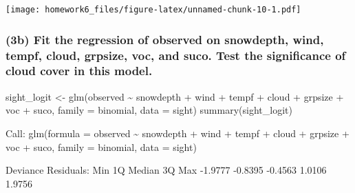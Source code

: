 \documentclass[
]{article}
\newenvironment{Shaded}{\begin{snugshade}}{\end{snugshade}}
\newcommand{\AttributeTok}[1]{\textcolor[rgb]{0.77,0.63,0.00}{#1}}
\newcommand{\FloatTok}[1]{\textcolor[rgb]{0.00,0.00,0.81}{#1}}
\newcommand{\FunctionTok}[1]{\textcolor[rgb]{0.00,0.00,0.00}{#1}}
\newcommand{\NormalTok}[1]{#1}
\newcommand{\OtherTok}[1]{\textcolor[rgb]{0.56,0.35,0.01}{#1}}
\newcommand{\SpecialCharTok}[1]{\textcolor[rgb]{0.00,0.00,0.00}{#1}}
\begin{document}
\texttt{[image: homework6\_files/figure-latex/unnamed-chunk-10-1.pdf]}

\hypertarget{b-fit-the-regression-of-observed-on-snowdepth-wind-tempf-cloud-grpsize-voc-and-suco.-test-the-significance-of-cloud-cover-in-this-model.}{%
\subsubsection{(3b) Fit the regression of observed on snowdepth, wind,
tempf, cloud, grpsize, voc, and suco. Test the significance of cloud
cover in this
model.}\label{b-fit-the-regression-of-observed-on-snowdepth-wind-tempf-cloud-grpsize-voc-and-suco.-test-the-significance-of-cloud-cover-in-this-model.}}

\begin{Shaded}
\begin{Highlighting}[]
\NormalTok{sight\_logit }\OtherTok{\textless{}{-}} \FunctionTok{glm}\NormalTok{(observed }\SpecialCharTok{\textasciitilde{}}\NormalTok{ snowdepth }\SpecialCharTok{+}\NormalTok{ wind }\SpecialCharTok{+}\NormalTok{ tempf }\SpecialCharTok{+}\NormalTok{ cloud }\SpecialCharTok{+}\NormalTok{ grpsize }\SpecialCharTok{+}\NormalTok{ voc }\SpecialCharTok{+}\NormalTok{ suco, }\AttributeTok{family =}\NormalTok{ binomial, }\AttributeTok{data =}\NormalTok{ sight)}
\FunctionTok{summary}\NormalTok{(sight\_logit)}

\NormalTok{Call}\SpecialCharTok{:}
\FunctionTok{glm}\NormalTok{(}\AttributeTok{formula =}\NormalTok{ observed }\SpecialCharTok{\textasciitilde{}}\NormalTok{ snowdepth }\SpecialCharTok{+}\NormalTok{ wind }\SpecialCharTok{+}\NormalTok{ tempf }\SpecialCharTok{+}\NormalTok{ cloud }\SpecialCharTok{+}\NormalTok{ grpsize }\SpecialCharTok{+} 
\NormalTok{    voc }\SpecialCharTok{+}\NormalTok{ suco, }\AttributeTok{family =}\NormalTok{ binomial, }\AttributeTok{data =}\NormalTok{ sight)}

\NormalTok{Deviance Residuals}\SpecialCharTok{:} 
\NormalTok{    Min       1Q   Median       3Q      Max  }
\SpecialCharTok{{-}}\FloatTok{1.9777}  \SpecialCharTok{{-}}\FloatTok{0.8395}  \SpecialCharTok{{-}}\FloatTok{0.4563}   \FloatTok{1.0106}   \FloatTok{1.9756}  


\end{Highlighting}
\end{Shaded}
\end{document}
